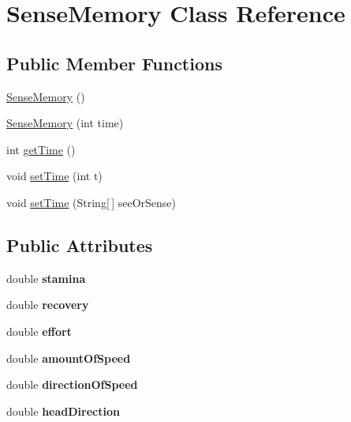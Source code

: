 \hypertarget{classSenseMemory}{
\section{SenseMemory Class Reference}
\label{classSenseMemory}
}
\subsection*{Public Member Functions}
\begin{DoxyCompactItemize}
\item 
\hyperlink{classSenseMemory_a32a295ecd345b8986a9b92fda30259bc}{SenseMemory} ()
\item 
\hyperlink{classSenseMemory_a8ab50b0370fc3e6abae7328fe62a0fb5}{SenseMemory} (int time)
\item 
int \hyperlink{classSenseMemory_ae3fba5ea37bb7cdb373b10688e5282a2}{getTime} ()
\item 
void \hyperlink{classSenseMemory_a20727a0f69e39b7b90a73ee4dbe8ce87}{setTime} (int t)
\item 
void \hyperlink{classSenseMemory_a5aadc0916b9ce835eaa720809cb0773e}{setTime} (String\mbox{[}$\,$\mbox{]} seeOrSense)
\end{DoxyCompactItemize}
\subsection*{Public Attributes}
\begin{DoxyCompactItemize}
\item 
\hypertarget{classSenseMemory_adf9105fd7f45b604a0d3ff737173fb53}{
double {\bfseries stamina}}
\label{classSenseMemory_adf9105fd7f45b604a0d3ff737173fb53}

\item 
\hypertarget{classSenseMemory_a6fab74f4565d406077213c210c0a032e}{
double {\bfseries recovery}}
\label{classSenseMemory_a6fab74f4565d406077213c210c0a032e}

\item 
\hypertarget{classSenseMemory_a3cc52c14473b7b9b3daa32e8c1b61d11}{
double {\bfseries effort}}
\label{classSenseMemory_a3cc52c14473b7b9b3daa32e8c1b61d11}

\item 
\hypertarget{classSenseMemory_a4192e69b13e8c192098feedb1b6c3a95}{
double {\bfseries amountOfSpeed}}
\label{classSenseMemory_a4192e69b13e8c192098feedb1b6c3a95}

\item 
\hypertarget{classSenseMemory_acdbd88e827afba6390767f9ec7e6dc7a}{
double {\bfseries directionOfSpeed}}
\label{classSenseMemory_acdbd88e827afba6390767f9ec7e6dc7a}

\item 
\hypertarget{classSenseMemory_aaa6b6600070183f9d0768d1cfe0e8c02}{
double {\bfseries headDirection}}
\label{classSenseMemory_aaa6b6600070183f9d0768d1cfe0e8c02}

\end{DoxyCompactItemize}


